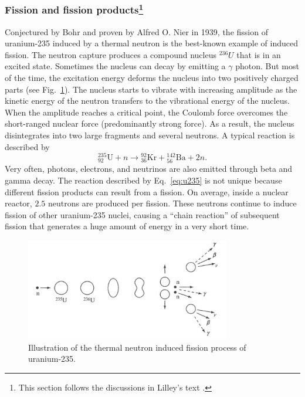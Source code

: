 \documentclass[nofootinbib,preprint,aps]{revtex4-1}
\begin{document}
    \subsubsection{Fission and fission products\footnote{
    This section follows the discussions in Lilley's text \cite[chapt. 10]{l01}.}}
        \label{sec:fission}
        Conjectured by Bohr and proven by Alfred O. Nier in 1939,
        the fission of uranium-235 induced by a thermal neutron
        is the best-known example of induced fission.\cite[chapt. 1]{gc01}
        The neutron capture produces a compound nucleus ${}^{236}U$ that is in an excited state.
        Sometimes the nucleus can decay by emitting a $\gamma$ photon.
        But most of the time, the excitation energy deforms the nucleus into two positively charged
        parts (see Fig.~\ref{fig:fission}).
        The nucleus starts to vibrate with increasing amplitude as the kinetic energy of the
        neutron transfers to the vibrational energy of the nucleus.
        When the
        amplitude reaches a critical point, the Coulomb force overcomes the short-ranged nuclear
        force (predominantly strong force). As a result, the nucleus disintegrates into two large fragments and several neutrons.
        A typical reaction is described by
        \begin{equation}
        {}^{235}_{92}\text{U} + n \rightarrow {}^{92}_{36}\text{Kr} + {}^{142}_{56}\text{Ba} + 2 n.
        \label{eq:u235}
        \end{equation}
        Very often, photons, electrons, and neutrinos are also emitted through beta and gamma decay.
        The reaction described by Eq.~\ref{eq:u235} is not unique because different fission products can result
        from a fission.
        On average, inside a nuclear reactor, $2.5$ neutrons are produced per fission. These neutrons
        continue to induce fission of other uranium-235 nuclei, causing a ``chain reaction'' of subsequent
        fission that generates a huge amount of energy in a very short time.
        \begin{figure}
            \centering
            \includegraphics[width=0.8\textwidth]{fission.png}
            \caption{Illustration of the thermal neutron induced fission process of uranium-235.\cite{l01}}
            \label{fig:fission}
        \end{figure}
\end{document}
